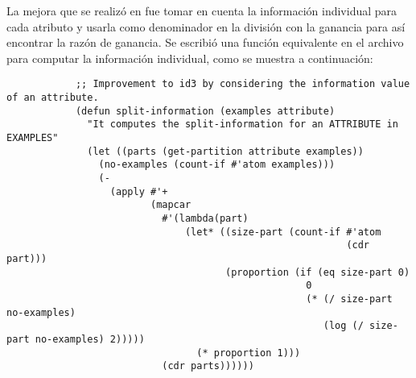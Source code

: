 \begin{itemize}
\begin{solution}
        La mejora que se realizó en  fue tomar en cuenta la información individual para cada atributo y usarla como denominador en la división con la ganancia para así encontrar la razón de ganancia. Se escribió una función equivalente en el archivo  para computar la información individual, como se muestra a continuación:
        \begin{verbatim}
            ;; Improvement to id3 by considering the information value of an attribute.
            (defun split-information (examples attribute)
              "It computes the split-information for an ATTRIBUTE in EXAMPLES"
              (let ((parts (get-partition attribute examples))
                (no-examples (count-if #'atom examples)))
                (- 
                  (apply #'+ 
                         (mapcar 
                           #'(lambda(part)
                               (let* ((size-part (count-if #'atom 
                                                           (cdr part)))
                                      (proportion (if (eq size-part 0) 
                                                    0
                                                    (* (/ size-part no-examples)
                                                       (log (/ size-part no-examples) 2)))))
                                 (* proportion 1)))
                           (cdr parts))))))
        \end{verbatim}


\end{solution}
\end{itemize}
